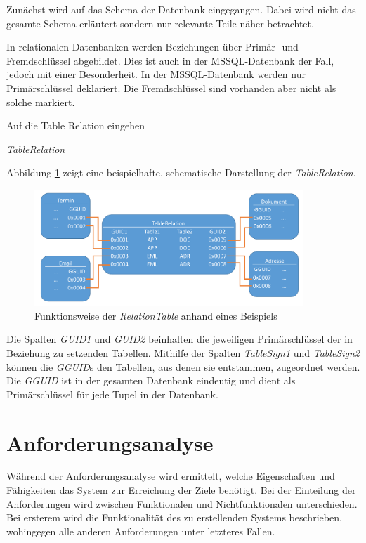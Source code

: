 Zunächst wird auf das Schema der Datenbank eingegangen. Dabei wird nicht das gesamte Schema erläutert sondern nur relevante Teile näher betrachtet.    

In relationalen Datenbanken werden Beziehungen über Primär- und Fremdschlüssel abgebildet. Dies ist auch in der MSSQL-Datenbank der Fall, jedoch mit einer Besonderheit. In der MSSQL-Datenbank werden nur Primärschlüssel deklariert. Die Fremdschlüssel sind vorhanden aber nicht als solche markiert. 

Auf die Table Relation eingehen

\textit{TableRelation} 


Abbildung \ref{gw_2} zeigt eine beispielhafte, schematische Darstellung der \textit{TableRelation}.

\begin{figure}[ht]
	\centering
  \includegraphics[width=0.9\textwidth, width=0.9\textwidth]{pics/gW_tablerealtion.pdf}
	\caption{Funktionsweise der \textit{RelationTable} anhand eines Beispiels}
	\label{gw_2}
\end{figure}

Die Spalten \textit{GUID1} und \textit{GUID2} beinhalten die jeweiligen Primärschlüssel der in Beziehung zu setzenden Tabellen. Mithilfe der Spalten \textit{TableSign1} und \textit{TableSign2} können die \textit{GGUID}s den Tabellen, aus denen sie entstammen, zugeordnet werden. Die \textit{GGUID} ist in der gesamten Datenbank eindeutig und dient als Primärschlüssel für jede Tupel in der Datenbank.

\section{Anforderungsanalyse}
\label{ch:Systemanalyse:sec:Anforderungsanalyse}

Während der Anforderungsanalyse wird ermittelt, welche Eigenschaften und Fähigkeiten das System zur Erreichung der Ziele benötigt. Bei der Einteilung der Anforderungen wird zwischen Funktionalen und Nichtfunktionalen unterschieden. Bei ersterem wird die Funktionalität des zu erstellenden Systems beschrieben, wohingegen alle anderen Anforderungen unter letzteres Fallen. 

